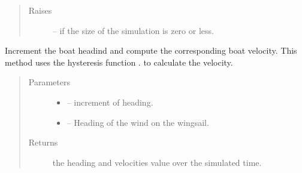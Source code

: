 \documentclass[letterpaper,10pt,english]{sphinxmanual}
\begin{document}
\begin{fulllineitems}
\begin{quote}
\begin{description}
\begin{itemize}
\end{itemize}

\item[{Raises}] \leavevmode
{} -- if the size of the simulation is zero or less.

\end{description}\end{quote}

\begin{fulllineitems}
\label{\detokenize{package1:Simulator.Simulator.computeNewValues}}
Increment the boat headind and compute the corresponding boat velocity. This method uses the hysteresis function
.
to calculate the velocity.
\begin{quote}\begin{description}
\item[{Parameters}] \leavevmode\begin{itemize}
\item {} 
 -- increment of heading.

\item {} 
 -- Heading of the wind on the wingsail.

\end{itemize}

\item[{Returns}] \leavevmode
the heading and velocities value over the simulated time.

\end{description}\end{quote}

\end{fulllineitems}


\begin{fulllineitems}
\label{\detokenize{package1:Simulator.Simulator.getHdg}}
\end{fulllineitems}


\begin{fulllineitems}
\label{\detokenize{package1:Simulator.Simulator.getLength}}
\end{fulllineitems}


\end{fulllineitems}
\end{document}
